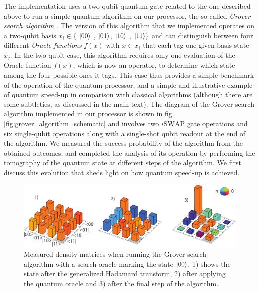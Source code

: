 The implementation  uses a two-qubit quantum gate related to the one described above to run a simple quantum algorithm on our processor, the so called {\it Grover search algorithm} \citep{Grover_Quantum_1997}. The version of this algorithm that we implemented operates on a two-qubit basis $x_i \in \{$ $\left| 00 \right>$ , $\left| 01 \right>$, $\left| 10 \right>$ , $\left| 11 \right>\}$ and can distinguish between four different {\it Oracle functions} $f(x)$ with $x \in x_i$ that each tag one given basis state $x_j$. In the two-qubit case, this algorithm requires only one evaluation of the Oracle function $f(x)$, which is now an operator,  to determine which state among the four possible ones it  tags. This case thus provides a simple    benchmark of   the operation of the quantum processor, and a simple and illustrative example of  quantum  speed-up  in comparison      with  classical algorithms (although there are some subtleties, as discussed in the main text). The diagram of the   Grover search algorithm implemented in our processor is shown in fig. \ref{fig:grover_algorithm_schematic} and involves two $i\mathrm{SWAP}$ gate operations and six single-qubit operations along with a single-shot qubit readout at the end of the algorithm. We measured the success probability of the algorithm from   the obtained outcomes, and completed the analysis of its operation by performing the   tomography of the quantum state at different steps of the algorithm. We first discuss this evolution  that sheds light on how  quantum speed-up is achieved.  

\begin{figure}[ht!]
	\centering
		\includegraphics[width=1.\textwidth]{./material/figures/2-qubit-processor/grover/grover-density-matrices-state-1}
	\caption[Measured density matrices when running the Grover algorithm]{Measured density matrices when running the Grover search algorithm with a search oracle marking the state $\left| 00 \right>$. 1) shows the state after the generalized Hadamard transform, 2) after applying the quantum oracle and 3) after the final step of the algorithm.} 
	\label{fig:grover_density_matrices_state_1}
\end{figure}

